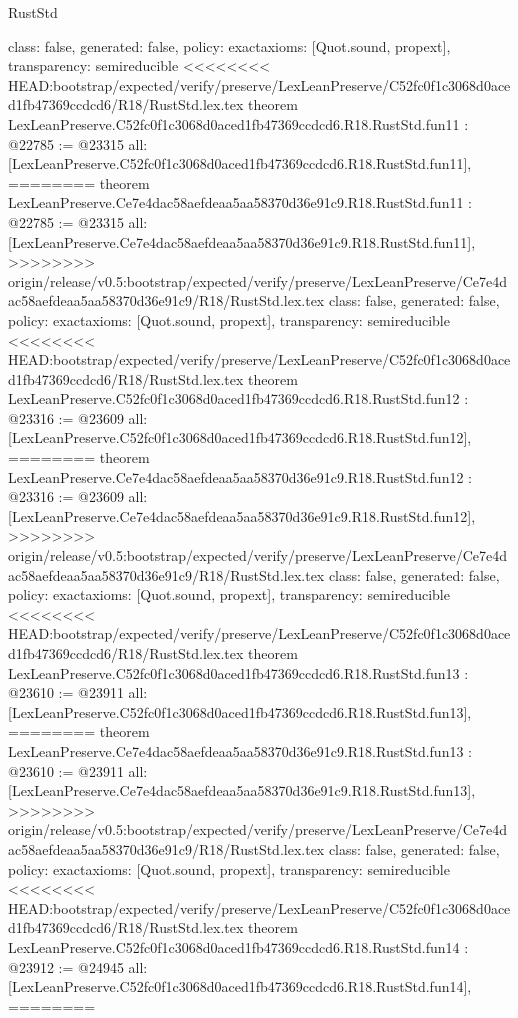\begin{lexlean}{RustStd}
\begin{coremodule}
{\begin{coremodule}
{{{{{{{{{{{{{{  class: false,
  generated: false,
  policy: exact{axioms: [Quot.sound, propext]},
  transparency: semireducible
}
<<<<<<<< HEAD:bootstrap/expected/verify/preserve/LexLeanPreserve/C52fc0f1c3068d0aced1fb47369ccdcd6/R18/RustStd.lex.tex
theorem LexLeanPreserve.C52fc0f1c3068d0aced1fb47369ccdcd6.R18.RustStd.fun11 : @22785 := @23315 {
  all: [LexLeanPreserve.C52fc0f1c3068d0aced1fb47369ccdcd6.R18.RustStd.fun11],
========
theorem LexLeanPreserve.Ce7e4dac58aefdeaa5aa58370d36e91c9.R18.RustStd.fun11 : @22785 := @23315 {
  all: [LexLeanPreserve.Ce7e4dac58aefdeaa5aa58370d36e91c9.R18.RustStd.fun11],
>>>>>>>> origin/release/v0.5:bootstrap/expected/verify/preserve/LexLeanPreserve/Ce7e4dac58aefdeaa5aa58370d36e91c9/R18/RustStd.lex.tex
  class: false,
  generated: false,
  policy: exact{axioms: [Quot.sound, propext]},
  transparency: semireducible
}
<<<<<<<< HEAD:bootstrap/expected/verify/preserve/LexLeanPreserve/C52fc0f1c3068d0aced1fb47369ccdcd6/R18/RustStd.lex.tex
theorem LexLeanPreserve.C52fc0f1c3068d0aced1fb47369ccdcd6.R18.RustStd.fun12 : @23316 := @23609 {
  all: [LexLeanPreserve.C52fc0f1c3068d0aced1fb47369ccdcd6.R18.RustStd.fun12],
========
theorem LexLeanPreserve.Ce7e4dac58aefdeaa5aa58370d36e91c9.R18.RustStd.fun12 : @23316 := @23609 {
  all: [LexLeanPreserve.Ce7e4dac58aefdeaa5aa58370d36e91c9.R18.RustStd.fun12],
>>>>>>>> origin/release/v0.5:bootstrap/expected/verify/preserve/LexLeanPreserve/Ce7e4dac58aefdeaa5aa58370d36e91c9/R18/RustStd.lex.tex
  class: false,
  generated: false,
  policy: exact{axioms: [Quot.sound, propext]},
  transparency: semireducible
}
<<<<<<<< HEAD:bootstrap/expected/verify/preserve/LexLeanPreserve/C52fc0f1c3068d0aced1fb47369ccdcd6/R18/RustStd.lex.tex
theorem LexLeanPreserve.C52fc0f1c3068d0aced1fb47369ccdcd6.R18.RustStd.fun13 : @23610 := @23911 {
  all: [LexLeanPreserve.C52fc0f1c3068d0aced1fb47369ccdcd6.R18.RustStd.fun13],
========
theorem LexLeanPreserve.Ce7e4dac58aefdeaa5aa58370d36e91c9.R18.RustStd.fun13 : @23610 := @23911 {
  all: [LexLeanPreserve.Ce7e4dac58aefdeaa5aa58370d36e91c9.R18.RustStd.fun13],
>>>>>>>> origin/release/v0.5:bootstrap/expected/verify/preserve/LexLeanPreserve/Ce7e4dac58aefdeaa5aa58370d36e91c9/R18/RustStd.lex.tex
  class: false,
  generated: false,
  policy: exact{axioms: [Quot.sound, propext]},
  transparency: semireducible
}
<<<<<<<< HEAD:bootstrap/expected/verify/preserve/LexLeanPreserve/C52fc0f1c3068d0aced1fb47369ccdcd6/R18/RustStd.lex.tex
theorem LexLeanPreserve.C52fc0f1c3068d0aced1fb47369ccdcd6.R18.RustStd.fun14 : @23912 := @24945 {
  all: [LexLeanPreserve.C52fc0f1c3068d0aced1fb47369ccdcd6.R18.RustStd.fun14],
========
}}}}}}}}}}}}}}}}}
\end{coremodule}}
\end{coremodule}
\end{lexlean}

